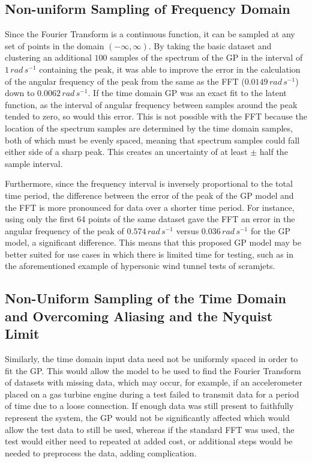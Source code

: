 \documentclass[12pt]{article}
\begin{document}
    \subsection{Non-uniform Sampling of Frequency Domain}
    Since the Fourier Transform is a continuous function, it can be sampled at any set of points in the domain $(-\infty, \infty)$.
    By taking the basic dataset and clustering an additional $100$ samples of the spectrum of the GP in the interval of $1 \, rad \, s^{-1}$ containing the peak, it was able to improve the error in the calculation of the angular frequency of the peak from the same as the FFT ($0.0149 \, rad \, s^{-1}$) down to $0.0062 \, rad \, s^{-1} $.
    If the time domain GP was an exact fit to the latent function, as the interval of angular frequency between samples around the peak tended to zero, so would this error.
    This is not possible with the FFT because the location of the spectrum samples are determined by the time domain samples, both of which must be evenly spaced, meaning that spectrum samples could fall either side of a sharp peak.
    This creates an uncertainty of at least $\pm$ half the sample interval.

    Furthermore, since the frequency interval is inversely proportional to the total time period, the difference between the error of the peak of the GP model and the FFT is more pronounced for data over a shorter time period.
    For instance, using only the first 64 points of the same dataset gave the FFT an error in the angular frequency of the peak of $0.574 \, rad \, s^{-1}$ versus $0.036 \, rad \, s^{-1}$ for the GP model, a significant difference.
    This means that this proposed GP model may be better suited for use cases in which there is limited time for testing, such as in the aforementioned example of hypersonic wind tunnel tests of scramjets.

    \subsection{Non-Uniform Sampling of the Time Domain and Overcoming Aliasing and the Nyquist Limit}
    Similarly, the time domain input data need not be uniformly spaced in order to fit the GP\@.
    This would allow the model to be used to find the Fourier Transform of datasets with missing data, which may occur, for example, if an accelerometer placed on a gas turbine engine during a test failed to transmit data for a period of time due to a loose connection.
    If enough data was still present to faithfully represent the system, the GP would not be significantly affected which would allow the test data to still be used, whereas if the standard FFT was used, the test would either need to repeated at added cost, or additional steps would be needed to preprocess the data, adding complication.
\end{document}
